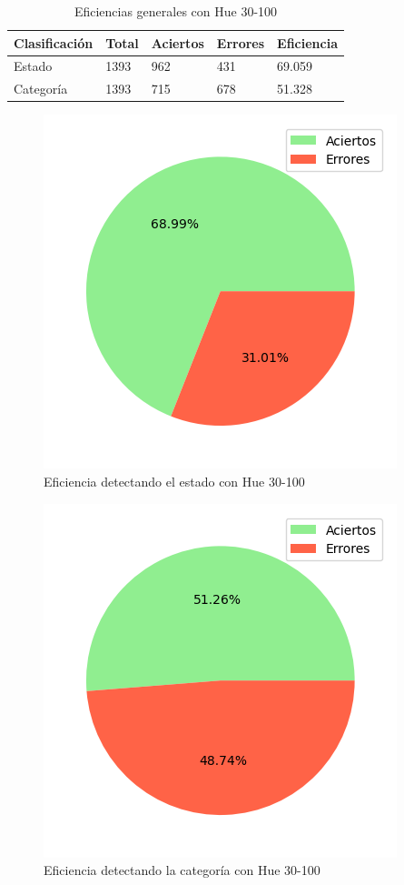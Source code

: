 \begin{table}[H]
\centering
\begin{tabular}{|l|l|l|l|l|}
\hline 
\textbf{Clasificación} & \textbf{Total} & \textbf{Aciertos} & \textbf{Errores} & \textbf{Eficiencia} \\
\hline
Estado & 1393 & 962 & 431 & 69.059 \\
\hline 
Categoría & 1393 & 715 & 678 & 51.328 \\
\hline 
\end{tabular}
\caption{Eficiencias generales con Hue 30-100}
\label{table:efficiency_general_30_100}
\end{table}

\captionsetup[figure]{skip=-10pt}

\begin{figure}[H]
\centering
\includegraphics[scale=0.6]{images/result_global_state_30_100.png}
\caption{Eficiencia detectando el estado con Hue 30-100}
\label{img:efficiency_state_30_100}
\end{figure}

\begin{figure}[H]
\centering
\includegraphics[scale=0.6]{images/result_global_class_30_100.png}
\caption{Eficiencia detectando la categoría con Hue 30-100}
\label{img:efficiency_category_30_100}
\end{figure}

